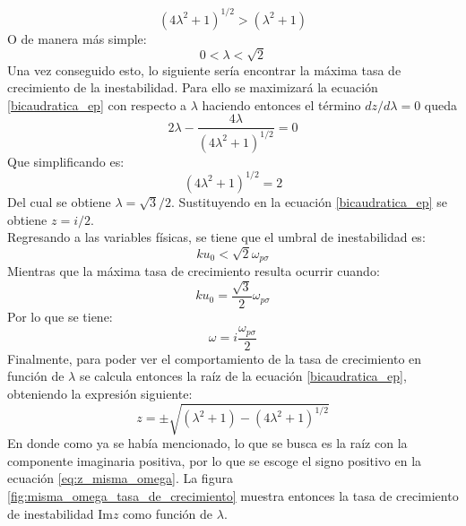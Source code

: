\documentclass[../tesis_main_file.tex]{subfiles}
\begin{document}
\begin{equation}
(4 \lambda ^2 + 1)^{1/2} > (\lambda^2 +1 )
\end{equation}
O de manera más simple:
\begin{equation}
0 < \lambda < \sqrt{2}
\end{equation}
Una vez conseguido esto, lo siguiente sería encontrar la máxima tasa de crecimiento de la inestabilidad. Para ello se maximizará  la ecuación \ref{bicaudratica_ep} con respecto a $\lambda$ haciendo entonces el término $dz/d \lambda = 0$ queda
\begin{equation}
2 \lambda - \frac{4 \lambda}{(4 \lambda ^2 + 1)^{1/2}}=0
\end{equation}
Que simplificando es:
\begin{equation}
(4 \lambda ^2 + 1)^{1/2} = 2
\end{equation}
Del cual se obtiene $\lambda = \sqrt{3} / 2$. Sustituyendo en la ecuación \ref{bicaudratica_ep} se obtiene $z = i / 2$.\\
Regresando a las variables físicas, se tiene que el umbral de inestabilidad es:
\begin{equation}
ku_0 < \sqrt{2}\omega_{p \sigma}
\end{equation}
Mientras que la máxima tasa de crecimiento resulta ocurrir cuando:
\begin{equation}
ku_0 = \frac{\sqrt{3}}{2}\omega_{p \sigma}
\end{equation}
Por lo que se tiene:
\begin{equation}
\omega  = i \frac{ \omega_{p \sigma}}{2}
\end{equation}
Finalmente, para poder ver el comportamiento de la tasa de crecimiento en función de $\lambda$ se calcula entonces la raíz de la ecuación \ref{bicaudratica_ep}, obteniendo la expresión siguiente:
\begin{equation}
\label{eq:z_misma_omega}
z = \pm \sqrt{(\lambda^2 +1) - (4 \lambda ^2 + 1)^{1/2}}
\end{equation}
En donde como ya se había mencionado, lo que se busca es la raíz con la componente imaginaria positiva, por lo que se escoge el signo positivo en la ecuación \ref{eq:z_misma_omega}. La figura \ref{fig:misma_omega_tasa_de_crecimiento} muestra entonces la tasa de crecimiento de inestabilidad Im$z$ como función de $\lambda$.
\end{document}
